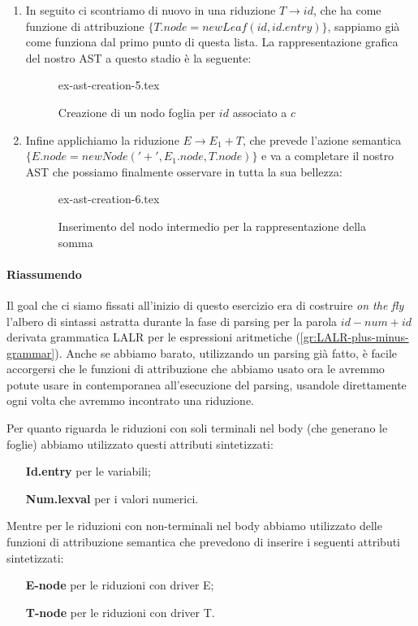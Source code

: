 \documentclass[class=book, crop=false, oneside, 12pt]{standalone}
\begin{document}
\begin{enumerate}
\begin{figure}[H]
    \end{figure} 
    \item In seguito ci scontriamo di nuovo in una riduzione \(T \to id\), che ha come funzione di attribuzione \(\{T.node = newLeaf(id, id.entry)\}\), sappiamo già come funziona dal primo punto di questa lista. La rappresentazione grafica del nostro AST a questo stadio è la seguente:
    \begin{figure}[H]
        \centering
        {ex-ast-creation-5.tex}
        \caption{Creazione di un nodo foglia per \(id\) associato a \(c\)}
    \end{figure} 
    \item Infine applichiamo la riduzione \(E \to E_1 + T\), che prevede l'azione semantica \(\{E.node = newNode ('+', E_1.node, T.node)\}\) e va a completare il nostro AST che possiamo finalmente osservare in tutta la sua bellezza:
    \begin{figure}[H]
        \centering
        {ex-ast-creation-6.tex}
        \caption{Inserimento del nodo intermedio per la rappresentazione della somma}
    \end{figure} 
\end{enumerate}

\paragraph{Riassumendo} Il goal che ci siamo fissati all'inizio di questo esercizio era di costruire \emph{on the fly} l'albero di sintassi astratta durante la fase di parsing per la parola \(id-num+id\) derivata grammatica LALR per le espressioni aritmetiche (\ref{gr:LALR-plus-minus-grammar}).
Anche se abbiamo barato, utilizzando un parsing già fatto, è facile accorgersi che le funzioni di attribuzione che abbiamo usato ora le avremmo potute usare in contemporanea all'esecuzione del parsing, usandole direttamente ogni volta che avremmo incontrato una riduzione.

\noindent Per quanto riguarda le riduzioni con soli terminali nel body (che generano le foglie) abbiamo utilizzato questi attributi sintetizzati:
\begin{itemize}
    \item[\textbf{Id.entry}] per le variabili;
    \item[\textbf{Num.lexval}] per i valori numerici.
\end{itemize}
Mentre per le riduzioni con non-terminali nel body abbiamo utilizzato delle funzioni di attribuzione semantica che prevedono di inserire i seguenti attributi sintetizzati:
\begin{itemize}
    \item[\textbf{E-node}] per le riduzioni con driver E;
    \item[\textbf{T-node}] per le riduzioni con driver T.
\end{itemize}
\end{document}
